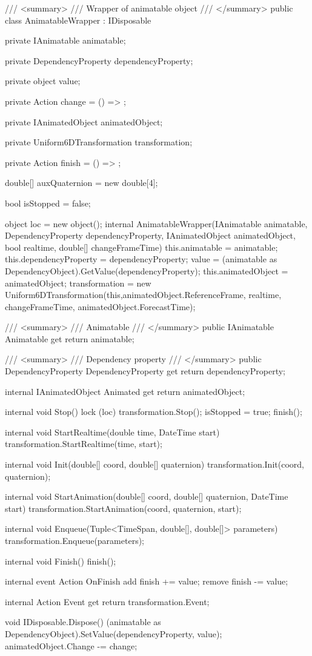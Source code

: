 \documentclass[10pt,journal,compsoc]{IEEEtran}
\begin{document}
/// <summary>
/// Wrapper of animatable object
/// </summary>
public class AnimatableWrapper : IDisposable
{
	
	private IAnimatable animatable;
	
	private DependencyProperty dependencyProperty;
	
	private object value;
	
	private Action change = () => { };
	
	private IAnimatedObject animatedObject;
	
	private Uniform6DTransformation transformation;
	
	private Action finish = () => { };
	
	double[] auxQuaternion = new double[4];
	
	bool isStopped = false;
	
	object loc = new object();
	internal AnimatableWrapper(IAnimatable animatable, DependencyProperty dependencyProperty,
	IAnimatedObject animatedObject, bool realtime, double[] changeFrameTime)
	{
		this.animatable = animatable;
		this.dependencyProperty = dependencyProperty;
		value = (animatable as DependencyObject).GetValue(dependencyProperty);
		this.animatedObject = animatedObject;
		transformation = new Uniform6DTransformation(this,animatedObject.ReferenceFrame,
		realtime, changeFrameTime, animatedObject.ForecastTime);
	}
	
	/// <summary>
	/// Animatable
	/// </summary>
	public IAnimatable Animatable
	{
		get
		{
			return animatable;
		}
	}
	
	/// <summary>
	/// Dependency property
	/// </summary>
	public DependencyProperty DependencyProperty
	{
		get
		{
			return dependencyProperty;
		}
	}
	
	
	
	internal IAnimatedObject Animated
	{
		get
		{
			return animatedObject;
		}
	}
	
	internal void Stop()
	{
		lock (loc)
		{
			transformation.Stop();
			isStopped = true;
			finish();
		}
	}
	
	internal void StartRealtime(double time, DateTime start)
	{
		transformation.StartRealtime(time, start);
	}
	
	internal void Init(double[] coord, double[] quaternion)
	{
		transformation.Init(coord, quaternion);
	}
	
	internal void StartAnimation(double[] coord, double[] quaternion, DateTime start)
	{
		transformation.StartAnimation(coord, quaternion, start);
	}
	
	
	internal void Enqueue(Tuple<TimeSpan, double[], double[]> parameters)
	{
		transformation.Enqueue(parameters);
	}
	
	internal void Finish()
	{
		finish();
	}
	
	internal event Action OnFinish
	{
		add { finish += value; }
		remove { finish -= value; }
	}
	
	internal  Action Event
	{
		get
		{
			return transformation.Event;
		}
	}
	
	void IDisposable.Dispose()
	{
		(animatable as DependencyObject).SetValue(dependencyProperty, value);
		animatedObject.Change -= change;
	}
	
}
\end{document}
